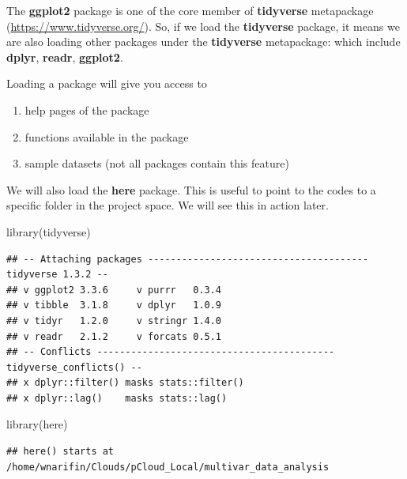 \documentclass[
  10pt,
]{krantz}
\newenvironment{Shaded}{\begin{snugshade}}{\end{snugshade}}
\newcommand{\FunctionTok}[1]{\textcolor[rgb]{0.00,0.00,0.00}{#1}}
\newcommand{\NormalTok}[1]{#1}
\providecommand{\tightlist}{%
  \setlength{\itemsep}{0pt}\setlength{\parskip}{0pt}}
\begin{document}
The \textbf{ggplot2} package is one of the core member of \textbf{tidyverse} metapackage (\url{https://www.tidyverse.org/}). So, if we load the \textbf{tidyverse} package, it means we are also loading other packages under the \textbf{tidyverse} metapackage: which include \textbf{dplyr}, \textbf{readr}, \textbf{ggplot2}.

Loading a package will give you access to

\begin{enumerate}
\def\labelenumi{\arabic{enumi}.}
\tightlist
\item
  help pages of the package
\item
  functions available in the package
\item
  sample datasets (not all packages contain this feature)
\end{enumerate}

We will also load the \textbf{here} package. This is useful to point to the codes to a specific folder in the project space. We will see this in action later.

\begin{Shaded}
\begin{Highlighting}[]
\FunctionTok{library}\NormalTok{(tidyverse)}
\end{Highlighting}
\end{Shaded}

\begin{verbatim}
## -- Attaching packages --------------------------------------- tidyverse 1.3.2 --
## v ggplot2 3.3.6     v purrr   0.3.4
## v tibble  3.1.8     v dplyr   1.0.9
## v tidyr   1.2.0     v stringr 1.4.0
## v readr   2.1.2     v forcats 0.5.1
## -- Conflicts ------------------------------------------ tidyverse_conflicts() --
## x dplyr::filter() masks stats::filter()
## x dplyr::lag()    masks stats::lag()
\end{verbatim}

\begin{Shaded}
\begin{Highlighting}[]
\FunctionTok{library}\NormalTok{(here)}
\end{Highlighting}
\end{Shaded}

\begin{verbatim}
## here() starts at /home/wnarifin/Clouds/pCloud_Local/multivar_data_analysis
\end{verbatim}
\end{document}
